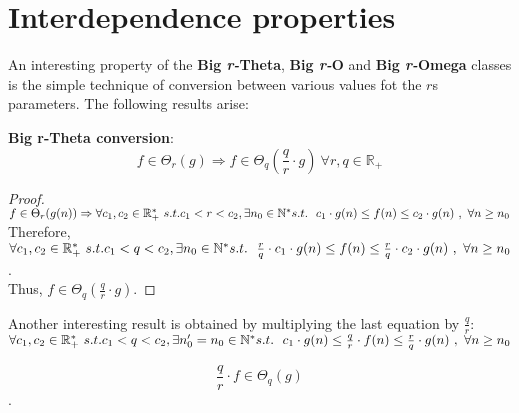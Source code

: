 \section{Interdependence properties}
An interesting property of the \textbf{Big \textit{r-}Theta},  \textbf{Big \textit{r-}O} and \textbf{Big \textit{r-}Omega} classes is the simple technique of conversion between various values fot the $r$s parameters. The following results arise:

\begin{theorem}
    \item \textbf{Big r-Theta conversion}:
    \[  f \in \Theta_{r}(g) \Rightarrow f \in \Theta_{q} \left( \frac{q}{r} \cdot g \right) \ \forall r,q \in \mathbb{R}_{+}\]
\end{theorem}

\begin{proof}
    $ f \in \Theta_{r}(g(n)) \Rightarrow \forall c_{1}, c_{2} \in \mathbb{R}^{*}_{+} \ s.t. c_{1}< r < c_{2} , \exists n_{0} \in \mathbb{N}^{*}\ \\ s.t.\ \ c_{1} \cdot g(n) \leq f(n) \leq c_{2} \cdot g(n)\ ,\  \forall n \geq n_{0} $ \\
    Therefore, $\forall c_{1}, c_{2} \in \mathbb{R}^{*}_{+} \ s.t. c_{1} < q < c_{2} , \exists n_{0} \in \mathbb{N}^{*}\ \\ s.t.\ \ \frac{r}{q} \cdot c_{1} \cdot g(n) \leq f(n) \leq \frac{r}{q} \cdot c_{2} \cdot g(n)\ ,\  \forall n \geq n_{0}$. \\
    Thus, $f \in \Theta_{q} \left( \frac{q}{r} \cdot g \right)$.
\end{proof}

Another interesting result is obtained by multiplying the last equation by $\frac{q}{r}$: \\
$\forall c_{1}, c_{2} \in \mathbb{R}^{*}_{+} \ s.t. c_{1} < q < c_{2} , \exists n_{0}' = n_{0} \in \mathbb{N}^{*}\ \\ s.t.\ \ c_{1} \cdot g(n) \leq \frac{q}{r} \cdot f(n) \leq \frac{r}{q} \cdot g(n)\ ,\  \forall n \geq n_{0}$
\begin{corollary}
    \[ \frac{q}{r} \cdot f \in \Theta_{q} \left( g \right)\].
\end{corollary}





